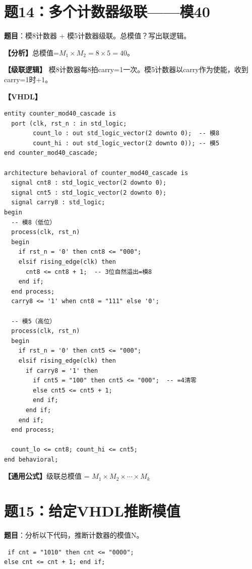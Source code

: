 \section{题14：多个计数器级联——模40}

\textbf{题目}：模8计数器 + 模5计数器级联。总模值？写出联逻辑。

\begin{solution}[完整解答]

\textbf{【分析】}总模值=$M_1 \times M_2 = 8 \times 5 = 40$。

\textbf{【级联逻辑】}
模8计数器每8拍carry=1一次。模5计数器以carry作为使能，收到carry=1时+1。

\textbf{【VHDL】}
\begin{lstlisting}
entity counter_mod40_cascade is
  port (clk, rst_n : in std_logic;
        count_lo : out std_logic_vector(2 downto 0);  -- 模8
        count_hi : out std_logic_vector(2 downto 0)); -- 模5
end counter_mod40_cascade;

architecture behavioral of counter_mod40_cascade is
  signal cnt8 : std_logic_vector(2 downto 0);
  signal cnt5 : std_logic_vector(2 downto 0);
  signal carry8 : std_logic;
begin
  -- 模8（低位）
  process(clk, rst_n)
  begin
    if rst_n = '0' then cnt8 <= "000";
    elsif rising_edge(clk) then
      cnt8 <= cnt8 + 1;  -- 3位自然溢出=模8
    end if;
  end process;
  carry8 <= '1' when cnt8 = "111" else '0';

  -- 模5（高位）
  process(clk, rst_n)
  begin
    if rst_n = '0' then cnt5 <= "000";
    elsif rising_edge(clk) then
      if carry8 = '1' then
        if cnt5 = "100" then cnt5 <= "000";  -- =4清零
        else cnt5 <= cnt5 + 1;
        end if;
      end if;
    end if;
  end process;

  count_lo <= cnt8; count_hi <= cnt5;
end behavioral;
\end{lstlisting}

\textbf{【通用公式】}级联总模值 = $M_1 \times M_2 \times \cdots \times M_k$

\end{solution}


\section{题15：给定VHDL推断模值}

\textbf{题目}：分析以下代码，推断计数器的模值N。
\begin{lstlisting}
 if cnt = "1010" then cnt <= "0000";
else cnt <= cnt + 1; end if;
\end{lstlisting}

